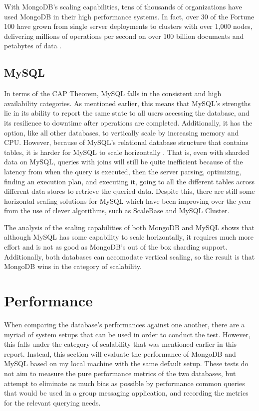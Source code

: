 \documentclass[12pt]{article}
\begin{document}
With MongoDB's scaling capabilities, tens of thousands of organizations have used MongoDB in their high performance systems. In fact, over 30 of the Fortune 100 have grown from single server deployments to clusters with over 1,000 nodes, delivering millions of operations per second on over 100 billion documents and petabytes of data \cite{mongodb_scale}.

\subsection{MySQL}

In terms of the CAP Theorem, MySQL falls in the consistent and high availability categories. As mentioned earlier, this means that MySQL's strengths lie in its ability to report the same state to all users accessing the database, and its resilience to downtime after operations are completed. Additionally, it has the option, like all other databases, to vertically scale by increasing memory and CPU. However, because of MySQL's relational database structure that contains tables, it is harder for MySQL to scale horizontally \cite{mysql_scale_issues}. That is, even with sharded data on MySQL, queries with joins will still be quite inefficient because of the latency from when the query is executed, then the server parsing, optimizing, finding an execution plan, and executing it, going to all the different tables across different data stores to retrieve the queried data. Despite this, there are still some horizontal scaling solutions for MySQL which have been improving over the year from the use of clever algorithms, such as ScaleBase and MySQL Cluster.

The analysis of the scaling capabilities of both MongoDB and MySQL shows that although MySQL has some capability to scale horizontally, it requires much more effort and is not as good as MongoDB's out of the box sharding support. Additionally, both databases can accomodate vertical scaling, so the result is that MongoDB wins in the category of scalability.


\section{Performance}

When comparing the database's performances against one another, there are a myriad of system setups that can be used in order to conduct the test. However, this falls under the category of scalability that was mentioned earlier in this report. Instead, this section will evaluate the performance of MongoDB and MySQL based on my local machine with the same default setup. These tests do not aim to measure the pure performance metrics of the two databases, but attempt to eliminate as much bias as possible by performance common queries that would be used in a group messaging application, and recording the metrics for the relevant querying needs. 
\end{document}
